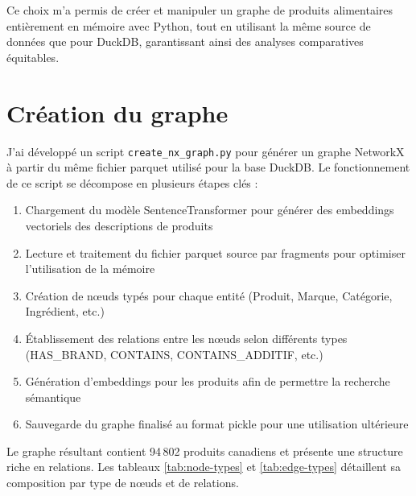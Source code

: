 \documentclass[a4paper,11pt]{article}
\begin{document}
Ce choix m'a permis de créer et manipuler un graphe de produits alimentaires entièrement en mémoire avec Python, tout en utilisant la même source de données que pour DuckDB, garantissant ainsi des analyses comparatives équitables.



\section{Création du graphe}
\label{sec:creation-graphe}

J'ai développé un script \texttt{create\_nx\_graph.py} pour générer un graphe NetworkX à partir du même fichier parquet utilisé pour la base DuckDB. Le fonctionnement de ce script se décompose en plusieurs étapes clés :

\begin{enumerate}
    \item Chargement du modèle SentenceTransformer pour générer des embeddings vectoriels des descriptions de produits
    \item Lecture et traitement du fichier parquet source par fragments pour optimiser l'utilisation de la mémoire
    \item Création de nœuds typés pour chaque entité (Produit, Marque, Catégorie, Ingrédient, etc.)
    \item Établissement des relations entre les nœuds selon différents types (HAS\_BRAND, CONTAINS, CONTAINS\_ADDITIF, etc.)
    \item Génération d'embeddings pour les produits afin de permettre la recherche sémantique
    \item Sauvegarde du graphe finalisé au format pickle pour une utilisation ultérieure
\end{enumerate}


Le graphe résultant contient 94\,802 produits canadiens et présente une structure riche en relations. Les tableaux \ref{tab:node-types} et \ref{tab:edge-types} détaillent sa composition par type de nœuds et de relations.
\end{document}
